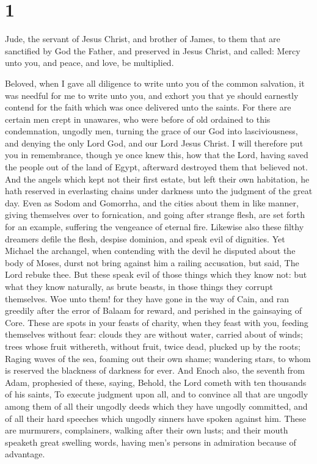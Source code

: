 \hypertarget{section}{%
\section{1}\label{section}}

 Jude, the servant of Jesus Christ, and brother of James,
to them that are sanctified by God the Father, and preserved in Jesus
Christ, and called:  Mercy unto you, and peace, and love,
be multiplied.

 Beloved, when I gave all diligence to write unto you of
the common salvation, it was needful for me to write unto you, and
exhort you that ye should earnestly contend for the faith which was once
delivered unto the saints.  For there are certain men
crept in unawares, who were before of old ordained to this condemnation,
ungodly men, turning the grace of our God into lasciviousness, and
denying the only Lord God, and our Lord Jesus Christ.  I
will therefore put you in remembrance, though ye once knew this, how
that the Lord, having saved the people out of the land of Egypt,
afterward destroyed them that believed not.  And the
angels which kept not their first estate, but left their own habitation,
he hath reserved in everlasting chains under darkness unto the judgment
of the great day.  Even as Sodom and Gomorrha, and the
cities about them in like manner, giving themselves over to fornication,
and going after strange flesh, are set forth for an example, suffering
the vengeance of eternal fire.  Likewise also these filthy
dreamers defile the flesh, despise dominion, and speak evil of
dignities.  Yet Michael the archangel, when contending
with the devil he disputed about the body of Moses, durst not bring
against him a railing accusation, but said, The Lord rebuke thee.
 But these speak evil of those things which they know
not: but what they know naturally, as brute beasts, in those things they
corrupt themselves.  Woe unto them! for they have gone in
the way of Cain, and ran greedily after the error of Balaam for reward,
and perished in the gainsaying of Core.  These are spots
in your feasts of charity, when they feast with you, feeding themselves
without fear: clouds they are without water, carried about of winds;
trees whose fruit withereth, without fruit, twice dead, plucked up by
the roots;  Raging waves of the sea, foaming out their
own shame; wandering stars, to whom is reserved the blackness of
darkness for ever.  And Enoch also, the seventh from
Adam, prophesied of these, saying, Behold, the Lord cometh with ten
thousands of his saints,  To execute judgment upon all,
and to convince all that are ungodly among them of all their ungodly
deeds which they have ungodly committed, and of all their hard speeches
which ungodly sinners have spoken against him.  These are
murmurers, complainers, walking after their own lusts; and their mouth
speaketh great swelling words, having men's persons in admiration
because of advantage.

